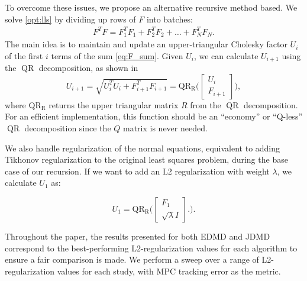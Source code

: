 \documentclass[../root.tex]{subfiles}
\newcommand{\changed}[1]{{\color{black} #1}}
\begin{document}
To overcome these issues, we propose an alternative recursive method based. We solve
\eqref{opt:lls} by dividing up rows of $F$ into batches:
\begin{align} \label{eq:F_sum}
  F^T F = F_1^T F_1 + F_2^T F_2 + \ldots + F_N^T F_N.
\end{align}
The main idea is to maintain and update an upper-triangular Cholesky factor $U_i$ of the
first $i$ terms of the sum \eqref{eq:F_sum}. Given $U_i$, we can calculate $U_{i+1}$ using
the $\operatorname{QR}$ decomposition, as shown in \cite{howell_ALTRO_2019}
\begin{equation}
  U_{i+1} = \sqrt{U_i^TU_i + F_{i+1}^TF_{i+1}} = 
  \operatorname{QR_R}\bigg( \begin{bmatrix} {U_i} \\ {F_{i+1}} \end{bmatrix} \bigg),
\end{equation}
where $\operatorname{QR_R}$ returns the upper triangular matrix $R$ from the 
$\operatorname{QR}$ decomposition. For an efficient implementation, this function should be
an ``economy'' or ``Q-less'' $\operatorname{QR}$ decomposition 
since the $Q$ matrix is never needed.

We also handle regularization of the normal equations, equivalent to adding Tikhonov
regularization to the original least squares problem, during the base
case of our recursion. If we want to add an L2 regularization with weight $\lambda$, we
calculate $U_1$ as:

\begin{equation}
  U_1 =  \operatorname{QR_R}\bigg( 
  \begin{bmatrix} {F_1} \\ \sqrt{\lambda} I \end{bmatrix}.
  \bigg).
\end{equation}

\changed{Throughout the paper, the results presented for both EDMD and JDMD
correspond to the best-performing L2-regularization values for each algorithm to
ensure a fair comparison is made. We perform a sweep over a range of
L2-regularization values for each study, with MPC tracking error as the metric.}
\end{document}
